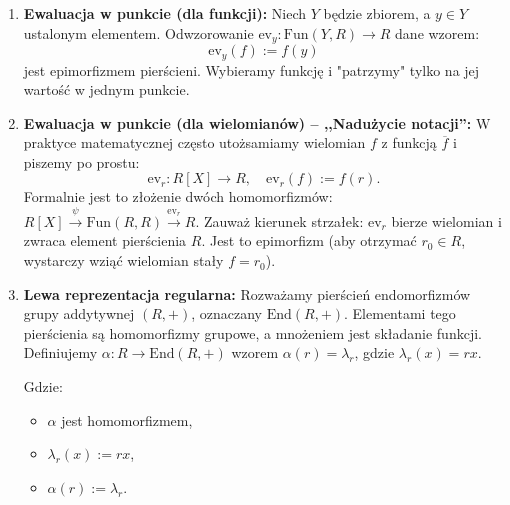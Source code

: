 \begin{enumerate}[label=\arabic*)]
\item \textbf{Ewaluacja w punkcie (dla funkcji):}
Niech $Y$ będzie zbiorem, a $y \in Y$ ustalonym elementem. Odwzorowanie $\text{ev}_y: \text{Fun}(Y, R) \to R$ dane wzorem:
\[ \text{ev}_y(f) := f(y) \]
jest epimorfizmem pierścieni. Wybieramy funkcję i "patrzymy" tylko na jej wartość w jednym punkcie.

\item \textbf{Ewaluacja w punkcie (dla wielomianów) – ,,Nadużycie notacji'':}
W praktyce matematycznej często utożsamiamy wielomian $f$ z funkcją $\overline{f}$ i piszemy po prostu:
\[ \text{ev}_r: R[X] \to R, \quad \text{ev}_r(f) := f(r). \]
Formalnie jest to złożenie dwóch homomorfizmów: $R[X] \xrightarrow{\psi} \text{Fun}(R, R) \xrightarrow{\text{ev}_r} R$. 
Zauważ kierunek strzałek: $\text{ev}_r$ bierze wielomian i zwraca element pierścienia $R$. Jest to epimorfizm (aby otrzymać $r_0 \in R$, wystarczy wziąć wielomian stały $f = r_0$).

\item \textbf{Lewa reprezentacja regularna:}
Rozważamy pierścień endomorfizmów grupy addytywnej $(R, +)$, oznaczany $\text{End}(R, +)$. Elementami tego pierścienia są homomorfizmy grupowe, a mnożeniem jest składanie funkcji.
Definiujemy $\alpha: R \to \text{End}(R, +)$ wzorem $\alpha(r) = \lambda_r$, gdzie $\lambda_r(x) = rx$.


\begin{figure}[H] %
        \centering
\end{figure}

Gdzie:
\begin{itemize}
	\item $\alpha $ jest homomorfizmem,
	\item $\lambda_{r}\left( x \right) := rx$,
	\item $\alpha \left( r \right) := \lambda_{r}$.
\end{itemize}



\end{enumerate}
